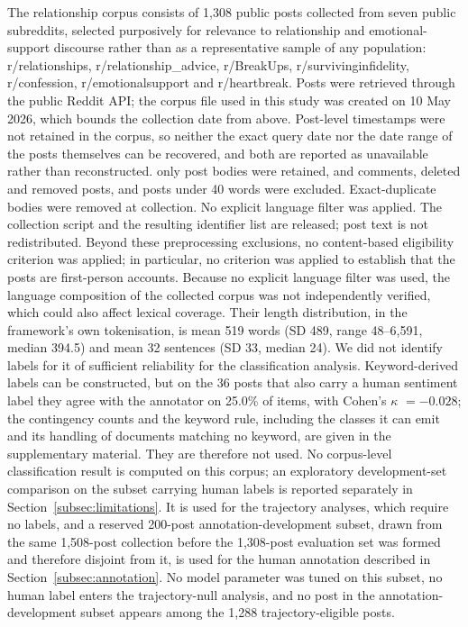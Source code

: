 \documentclass[fleqn,10pt]{wlscirep}
\begin{document}
The relationship corpus consists of 1{,}308 public posts collected from seven public subreddits, selected purposively for relevance to relationship and emotional-support discourse rather than as a representative sample of any population: r/relationships, r/relationship\_advice, r/BreakUps, r/survivinginfidelity, r/confession, r/emotionalsupport and r/heartbreak. Posts were retrieved through the public Reddit API; the corpus file used in this study was created on 10 May 2026, which bounds the collection date from above. Post-level timestamps were not retained in the corpus, so neither the exact query date nor the date range of the posts themselves can be recovered, and both are reported as unavailable rather than reconstructed. only post bodies were retained, and comments, deleted and removed posts, and posts under 40 words were excluded. Exact-duplicate bodies were removed at collection. No explicit language filter was applied. The collection script and the resulting identifier list are released; post text is not redistributed. Beyond these preprocessing exclusions, no content-based eligibility criterion was applied; in particular, no criterion was applied to establish that the posts are first-person accounts. Because no explicit language filter was used, the language composition of the collected corpus was not independently verified, which could also affect lexical coverage. Their length distribution, in the framework's own tokenisation, is mean 519 words (SD 489, range 48--6{,}591, median 394.5) and mean 32 sentences (SD 33, median 24). We did not identify labels for it of sufficient reliability for the classification analysis. Keyword-derived labels can be constructed, but on the 36 posts that also carry a human sentiment label they agree with the annotator on 25.0\% of items, with Cohen's $\kappa$\cite{cohen1960} $=-0.028$; the contingency counts and the keyword rule, including the classes it can emit and its handling of documents matching no keyword, are given in the supplementary material. They are therefore not used. No corpus-level classification result is computed on this corpus; an exploratory development-set comparison on the subset carrying human labels is reported separately in Section~\ref{subsec:limitations}. It is used for the trajectory analyses, which require no labels, and a reserved 200-post annotation-development subset, drawn from the same 1{,}508-post collection before the 1{,}308-post evaluation set was formed and therefore disjoint from it, is used for the human annotation described in Section~\ref{subsec:annotation}. No model parameter was tuned on this subset, no human label enters the trajectory-null analysis, and no post in the annotation-development subset appears among the 1{,}288 trajectory-eligible posts.
\end{document}
